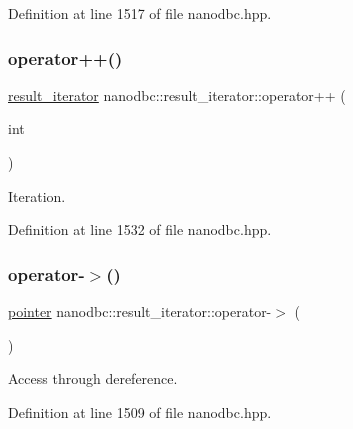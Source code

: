 Definition at line 1517 of file nanodbc.\+hpp.

\mbox{\label{classnanodbc_1_1result__iterator_acf9cdfaccbdad7650b11fb77be994aa4}} 
\subsubsection{\texorpdfstring{operator++()}{operator++()}\hspace{0.1cm}{\footnotesize\ttfamily [2/2]}}
{\footnotesize\ttfamily \mbox{\hyperlink{classnanodbc_1_1result__iterator}{result\+\_\+iterator}} nanodbc\+::result\+\_\+iterator\+::operator++ (\begin{DoxyParamCaption}\item[{int}]{ }\end{DoxyParamCaption})\hspace{0.3cm}{\ttfamily [inline]}}



Iteration. 



Definition at line 1532 of file nanodbc.\+hpp.

\mbox{\label{classnanodbc_1_1result__iterator_a4f6eafe2226e141383d4461fa5de2746}} 
\subsubsection{\texorpdfstring{operator-\/$>$()}{operator->()}}
{\footnotesize\ttfamily \mbox{\hyperlink{classnanodbc_1_1result__iterator_a49329c62a4366740ff86be23ca1eef0d}{pointer}} nanodbc\+::result\+\_\+iterator\+::operator-\/$>$ (\begin{DoxyParamCaption}{ }\end{DoxyParamCaption})\hspace{0.3cm}{\ttfamily [inline]}}



Access through dereference. 



Definition at line 1509 of file nanodbc.\+hpp.

